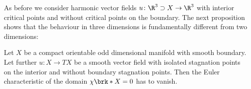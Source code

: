 As before we consider harmonic vector fields
$u\colon \R^3\supset X\to\R^3$ with interior critical points and 
without critical points on the boundary.
The next proposition shows that the behaviour in three dimensions is fundamentally different from two dimensions:
\begin{proposition}\label{pr:n3_domainCond}
  Let $X$ be a compact orientable odd dimensional manifold with smooth boundary.
  Let further $u\colon X\to TX$ be a smooth vector field with isolated stagnation points on the interior and without
  boundary stagnation points. Then the Euler characteristic of the domain $\chi\brk*{X}=0$ has to vanish.
\end{proposition}
